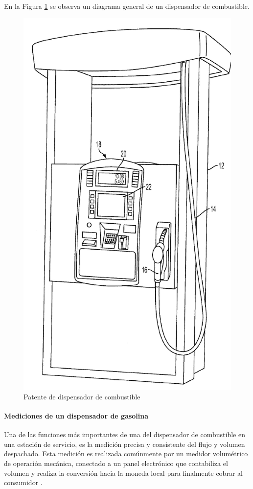 En la Figura \ref{fig:diagrama_dispensador} se observa un diagrama general de un dispensador de combustible.
\begin{figure}[H]
	\centering
	\includegraphics[scale=.25]{Capitulo2/images/diagrama_dispensador}
	\caption{Patente de dispensador de combustible}
	\label{fig:diagrama_dispensador}
\end{figure}

\paragraph{Mediciones de un dispensador de gasolina}
Una de las funciones más importantes de una del dispensador de combustible en una estación de servicio, es la medición precisa y consistente del flujo y volumen despachado. Esta medición es realizada comúnmente por un medidor volumétrico de operación mecánica, conectado a un panel electrónico que contabiliza el volumen y realiza la conversión hacia la moneda local para finalmente cobrar al consumidor \citep{MarcoTeorico3}.

